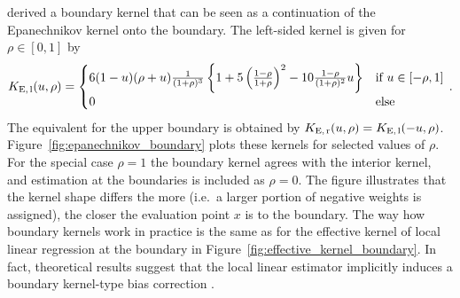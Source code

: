 \textcite[Table 1]{Müller_1991} derived a boundary kernel that can be seen as a continuation of the Epanechnikov kernel onto the boundary.
The left-sided kernel is given for $\rho \in [0, 1]$ by
\begin{align}
	K_{\text{E,\,l}}(u, \rho) = \begin{cases}
		6 (1-u) (\rho + u) \frac{1}{(1+\rho)^3} \left\{ 1 + 5\left( \frac{1-\rho}{1+\rho} \right)^2 - 10\frac{1-\rho}{(1+\rho)^2} u \right\} & \text{if } u \in [-\rho, 1] \\
		0 & \text{else}
	\end{cases} \,. 
\end{align}
The equivalent for the upper boundary is obtained by $K_{\text{E,\,r}}(u, \rho) = K_{\text{E,\,l}}(-u, \rho)$.
Figure~\ref{fig:epanechnikov_boundary} plots these kernels for selected values of $\rho$.
For the special case $\rho = 1$ the boundary kernel agrees with the interior kernel,
and estimation at the boundaries is included as $\rho = 0$.
The figure illustrates that the kernel shape differs the more (i.e.\ a larger portion of negative weights is assigned),
the closer the evaluation point $x$ is to the boundary.
The way how boundary kernels work in practice is the same as for the effective kernel of local linear regression at the boundary in Figure~\ref{fig:effective_kernel_boundary}.
In fact, theoretical results suggest that the local linear estimator implicitly induces a boundary kernel-type bias correction \parencite{Ruppert_1994}.
